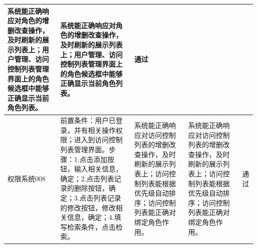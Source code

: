 \documentclass[titlepage,UTF8,linespread=1.5]{ctexart}
\begin{document}
\begin{longtable}{|p{4em}|p{14em}|p{7em}|p{7em}|p{2em}|}
    系统能正确响应对角色的增删改查操作，及时刷新的展示列表上；用户管理、访问控制列表管理界面上的角色候选框中能够正确显示当前角色列表。 &
    系统能正确响应对角色的增删改查操作，及时刷新的展示列表上；用户管理、访问控制列表管理界面上的角色候选框中能够正确显示当前角色列表。 &
    通过 \\\hline
    权限系统008 &
    前置条件：用户已登录，并有相关操作权限；进入到访问控制列表管理界面。步骤：1.点击添加按钮，输入相关信息，确定；2.点击列表记录的删除按钮，确定；3.点击列表记录的修改按钮，修改相关信息，确定；4.填写检索条件，点击检索。 &
    系统能正确响应对访问控制列表的增删改查操作，及时刷新的展示列表上；访问控制列表能根据优先级自动排序；访问控制列表能正确对绑定角色作用。 &
    系统能正确响应对访问控制列表的增删改查操作，及时刷新的展示列表上；访问控制列表能根据优先级自动排序；访问控制列表能正确对绑定角色作用。 &
    通过 \\\hline
\end{longtable}
\end{document}
